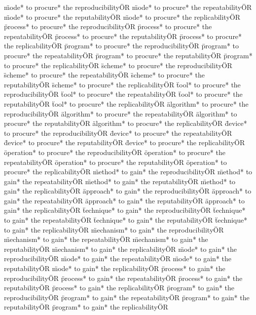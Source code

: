 \documentclass[
10pt, %
a4paper, %
oneside, %
headinclude,footinclude, %
BCOR5mm, %
]{scrartcl}
\begin{document}
\"mode* to procure* the reproducibility\" OR \"mode* to procure* the repeatability\" OR \"mode* to procure* the reputability\" OR \"mode* to procure* the replicability\" OR 
\"process* to procure* the reproducibility\" OR \"process* to procure* the repeatability\" OR \"process* to procure* the reputability\" OR \"process* to procure* the replicability\" OR 
\"program* to procure* the reproducibility\" OR \"program* to procure* the repeatability\" OR \"program* to procure* the reputability\" OR \"program* to procure* the replicability\" OR 
\"scheme* to procure* the reproducibility\" OR \"scheme* to procure* the repeatability\" OR \"scheme* to procure* the reputability\" OR \"scheme* to procure* the replicability\" OR 
\"tool* to procure* the reproducibility\" OR \"tool* to procure* the repeatability\" OR \"tool* to procure* the reputability\" OR \"tool* to procure* the replicability\" OR 
\"algorithm* to procure* the reproducibility\" OR \"algorithm* to procure* the repeatability\" OR \"algorithm* to procure* the reputability\" OR \"algorithm* to procure* the replicability\" OR 
\"device* to procure* the reproducibility\" OR \"device* to procure* the repeatability\" OR \"device* to procure* the reputability\" OR \"device* to procure* the replicability\" OR 
\"operation* to procure* the reproducibility\" OR \"operation* to procure* the repeatability\" OR \"operation* to procure* the reputability\" OR \"operation* to procure* the replicability\" OR 
\"method* to gain* the reproducibility\" OR \"method* to gain* the repeatability\" OR \"method* to gain* the reputability\" OR \"method* to gain* the replicability\" OR 
\"approach* to gain* the reproducibility\" OR \"approach* to gain* the repeatability\" OR \"approach* to gain* the reputability\" OR \"approach* to gain* the replicability\" OR 
\"technique* to gain* the reproducibility\" OR \"technique* to gain* the repeatability\" OR \"technique* to gain* the reputability\" OR \"technique* to gain* the replicability\" OR 
\"mechanism* to gain* the reproducibility\" OR \"mechanism* to gain* the repeatability\" OR \"mechanism* to gain* the reputability\" OR \"mechanism* to gain* the replicability\" OR 
\"mode* to gain* the reproducibility\" OR \"mode* to gain* the repeatability\" OR \"mode* to gain* the reputability\" OR \"mode* to gain* the replicability\" OR 
\"process* to gain* the reproducibility\" OR \"process* to gain* the repeatability\" OR \"process* to gain* the reputability\" OR \"process* to gain* the replicability\" OR 
\"program* to gain* the reproducibility\" OR \"program* to gain* the repeatability\" OR \"program* to gain* the reputability\" OR \"program* to gain* the replicability\" OR 
\end{document}
